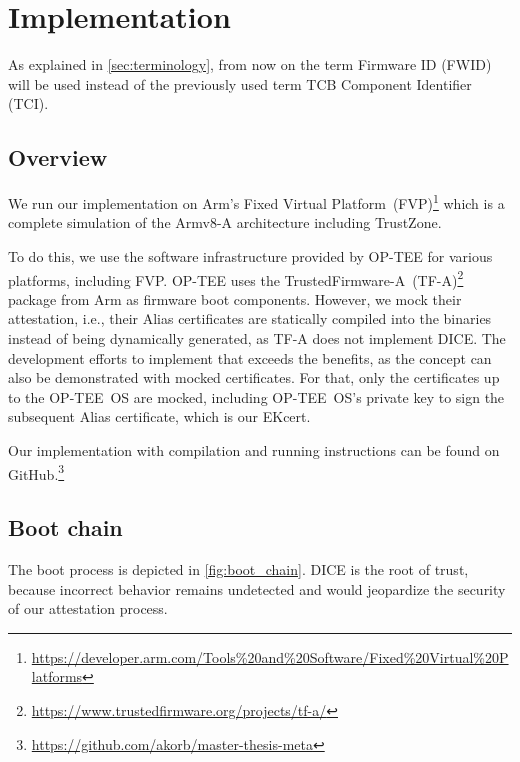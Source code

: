 
\chapter{Implementation}\label{chapter:implementation}

As explained in \autoref{sec:terminology}, from now on the term Firmware ID (FWID) will be used instead of the previously used term TCB Component Identifier (TCI).

\section{Overview}


We run our implementation on Arm's Fixed Virtual Platform~(FVP)\footnote{\url{https://developer.arm.com/Tools\%20and\%20Software/Fixed\%20Virtual\%20Platforms}} which is a complete simulation of the Armv8-A architecture including TrustZone.

To do this, we use the software infrastructure provided by OP-TEE for various platforms, including FVP\@.
OP-TEE uses the TrustedFirmware-A~(TF-A)\footnote{\url{https://www.trustedfirmware.org/projects/tf-a/}} package from Arm as firmware boot components.
However, we mock their attestation, i.e., their Alias certificates are statically compiled into the binaries instead of being dynamically generated, as TF-A does not implement DICE\@.
The development efforts to implement that exceeds the benefits, as the concept can also be demonstrated with mocked certificates.
For that, only the certificates up to the OP-TEE~OS are mocked, including OP-TEE~OS's private key to sign the subsequent Alias certificate, which is our EKcert.

Our implementation with compilation and running instructions can be found on GitHub.\footnote{\url{https://github.com/akorb/master-thesis-meta}}

\section{Boot chain}

The boot process is depicted in \autoref{fig:boot_chain}.
DICE is the root of trust, because incorrect behavior remains undetected and would jeopardize the security of our attestation process.




